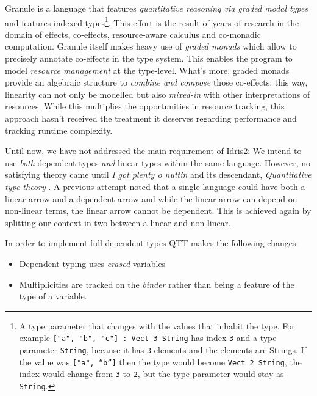 \documentclass[
]{article}
\providecommand{\tightlist}{%
  \setlength{\itemsep}{0pt}\setlength{\parskip}{0pt}}
\begin{document}
Granule is a language that features \emph{quantitative reasoning via
graded modal types} and features indexed types\footnote{A type parameter
  that changes with the values that inhabit the type. For example
  \texttt{{[}"a",\ "b",\ "c"{]}\ :\ Vect\ 3\ String} has index
  \texttt{3} and a type parameter \texttt{String}, because it has
  \texttt{3} elements and the elements are Strings. If the value was
  \texttt{{[}\textasciigrave{}"a",\ “b”{]}} then the type would become
  \texttt{Vect\ 2\ String}, the index would change from \texttt{3} to
  \texttt{2}, but the type parameter would stay as \texttt{String}.}.
This effort is the result of years of research in the domain of effects,
co-effects, resource-aware calculus and co-monadic
computation\cite{monad_or_comonad}. Granule itself makes heavy use of
\emph{graded monads}\cite{effect_coeffects_grading} which allow to
precisely annotate co-effects\cite{coeffect_computation} in the type
system. This enables the program to model \emph{resource management} at
the type-level. What's more, graded monads provide an algebraic
structure to \emph{combine and compose} those
co-effects\cite{quantitative_coeffects}; this way, linearity can not
only be modelled but also \emph{mixed-in} with other interpretations of
resources. While this multiplies the opportunities in resource tracking,
this approach hasn't received the treatment it deserves regarding
performance and tracking runtime complexity.

Until now, we have not addressed the main requirement of Idris2: We
intend to use \emph{both} dependent types \emph{and} linear types within
the same language. However, no satisfying theory came until \emph{I got
plenty o nuttin}\cite{nuttin} and its descendant, \emph{Quantitative
type theory} \cite{qtt}. A previous
attempt\cite{integrating_linear_dependent} noted that a single language
could have both a linear arrow and a dependent arrow and while the
linear arrow can depend on non-linear terms, the linear arrow cannot be
dependent. This is achieved again by splitting our context in two
between a linear and non-linear.

In order to implement full dependent types QTT makes the following
changes:

\begin{itemize}
\tightlist
\item
  Dependent typing uses \emph{erased} variables
\item
  Multiplicities are tracked on the \emph{binder} rather than being a
  feature of the type of a variable.
\end{itemize}
\end{document}
